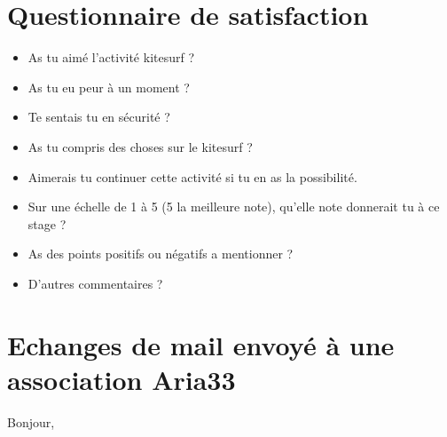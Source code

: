 \documentclass[12pt,a4paper]{report}
\begin{document}
\appendix
\appendixpage
\addappheadtotoc
\chapter{Questionnaire de satisfaction\label{questionnaire}}
\begin{itemize}
\item As tu aimé l'activité kitesurf ?
\item As tu eu peur à un moment ?
\item Te sentais tu en sécurité ?
\item As tu compris des choses sur le kitesurf ?
\item Aimerais tu continuer cette activité si tu en as la possibilité.
\item Sur une échelle de 1 à 5 (5 la meilleure note), qu'elle note donnerait tu à ce stage ?
\item As des points positifs ou négatifs a mentionner ?
\item D'autres commentaires ?

\end{itemize}
\chapter{Echanges de mail envoyé à une association Aria33}\label{appendix_mail}
Bonjour,
\end{document}
